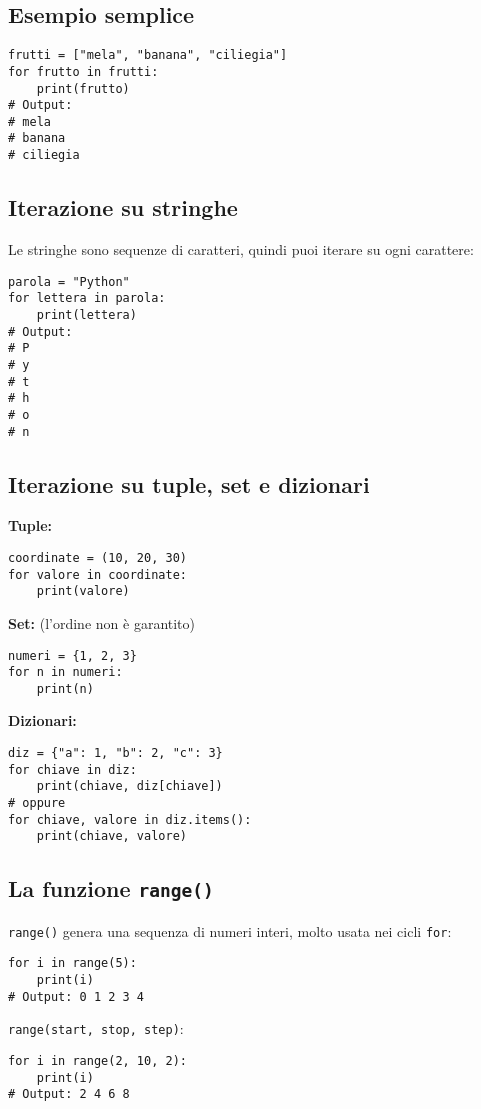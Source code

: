 \documentclass[a4paper,12pt]{article}
\begin{document}
\subsection*{Esempio semplice}
\begin{lstlisting}
frutti = ["mela", "banana", "ciliegia"]
for frutto in frutti:
    print(frutto)
# Output:
# mela
# banana
# ciliegia
\end{lstlisting}

\subsection*{Iterazione su stringhe}
Le stringhe sono sequenze di caratteri, quindi puoi iterare su ogni carattere:
\begin{lstlisting}
parola = "Python"
for lettera in parola:
    print(lettera)
# Output:
# P
# y
# t
# h
# o
# n
\end{lstlisting}

\subsection*{Iterazione su tuple, set e dizionari}
\textbf{Tuple:}
\begin{lstlisting}
coordinate = (10, 20, 30)
for valore in coordinate:
    print(valore)
\end{lstlisting}

\textbf{Set:} (l'ordine non è garantito)
\begin{lstlisting}
numeri = {1, 2, 3}
for n in numeri:
    print(n)
\end{lstlisting}

\textbf{Dizionari:}
\begin{lstlisting}
diz = {"a": 1, "b": 2, "c": 3}
for chiave in diz:
    print(chiave, diz[chiave])
# oppure
for chiave, valore in diz.items():
    print(chiave, valore)
\end{lstlisting}

\subsection*{La funzione \texttt{range()}}
\texttt{range()} genera una sequenza di numeri interi, molto usata nei cicli \texttt{for}:
\begin{lstlisting}
for i in range(5):
    print(i)
# Output: 0 1 2 3 4
\end{lstlisting}
\texttt{range(start, stop, step)}:
\begin{lstlisting}
for i in range(2, 10, 2):
    print(i)
# Output: 2 4 6 8
\end{lstlisting}
\end{document}
